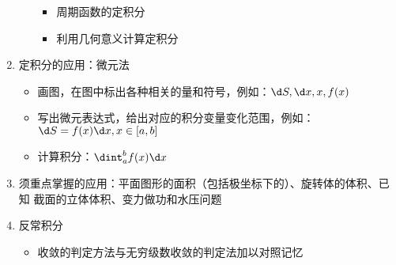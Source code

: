 \begin{enumerate}
\begin{itemize}
\begin{itemize}
	  \item 周期函数的定积分 
	  \item 利用几何意义计算定积分
	\end{itemize}
  \end{itemize}
  \item 定积分的应用：微元法
  \begin{itemize} 
	\item 画图，在图中标出各种相关的量和符号，例如：$\d S,\d x,x,f(x)$
	\item 写出微元表达式，给出对应的积分变量变化范围，例如：
	  $\d S=f(x)\d x,x\in[a,b]$
	\item 计算积分：$\dint_a^bf(x)\d x$
  \end{itemize}
  \item 须重点掌握的应用：平面图形的面积（包括极坐标下的）、旋转体的体积、已知
  截面的立体体积、变力做功和水压问题
  \item 反常积分
  \begin{itemize}
    \item 收敛的判定方法与无穷级数收敛的判定法加以对照记忆
  \end{itemize}
\end{enumerate}

\bigskip

